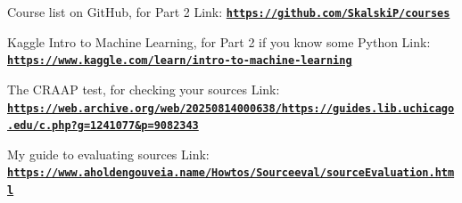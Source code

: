 \documentclass[12pt]{article}
\begin{document}
Course list on GitHub, for Part 2
Link: \href{https://github.com/SkalskiP/courses}{\textbf{\nolinkurl{https://github.com/SkalskiP/courses}}}

Kaggle Intro to Machine Learning, for Part 2 if you know some Python
Link: \href{https://www.kaggle.com/learn/intro-to-machine-learning}{\textbf{\nolinkurl{https://www.kaggle.com/learn/intro-to-machine-learning}}}

The CRAAP test, for checking your sources
Link: \href{https://web.archive.org/web/20250814000638/https://guides.lib.uchicago.edu/c.php?g=1241077&p=9082343}{\textbf{\nolinkurl{https://web.archive.org/web/20250814000638/https://guides.lib.uchicago.edu/c.php?g=1241077&p=9082343}}}

My guide to evaluating sources
Link: \href{https://www.aholdengouveia.name/Howtos/Sourceeval/sourceEvaluation.html}{\textbf{\nolinkurl{https://www.aholdengouveia.name/Howtos/Sourceeval/sourceEvaluation.html}}}
\end{document}
